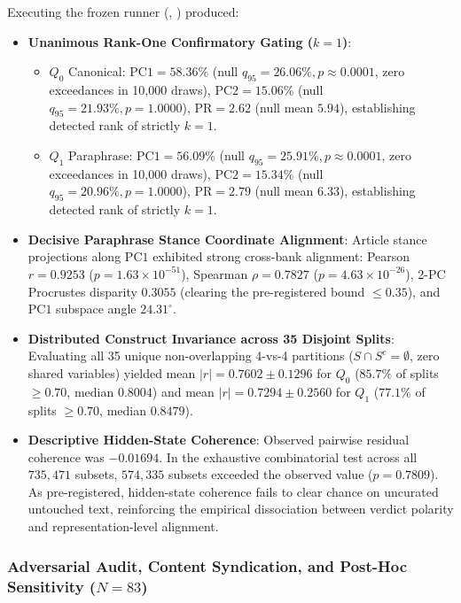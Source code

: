 Executing the frozen runner (, ) produced:
\begin{itemize}
    \item \textbf{Unanimous Rank-One Confirmatory Gating ($k=1$)}:
    \begin{itemize}
        \item $Q_0$ Canonical: $\mathrm{PC1} = 58.36\%$ (null $q_{95} = 26.06\%, p \approx 0.0001$, zero exceedances in 10,000 draws), $\mathrm{PC2} = 15.06\%$ (null $q_{95} = 21.93\%, p = 1.0000$), $\mathrm{PR} = 2.62$ (null mean $5.94$), establishing detected rank of strictly $k = 1$.
        \item $Q_1$ Paraphrase: $\mathrm{PC1} = 56.09\%$ (null $q_{95} = 25.91\%, p \approx 0.0001$, zero exceedances in 10,000 draws), $\mathrm{PC2} = 15.34\%$ (null $q_{95} = 20.96\%, p = 1.0000$), $\mathrm{PR} = 2.79$ (null mean $6.33$), establishing detected rank of strictly $k = 1$.
    \end{itemize}
    \item \textbf{Decisive Paraphrase Stance Coordinate Alignment}: Article stance projections along $\mathrm{PC1}$ exhibited strong cross-bank alignment: Pearson $r = 0.9253$ ($p = 1.63 \times 10^{-51}$), Spearman $\rho = 0.7827$ ($p = 4.63 \times 10^{-26}$), 2-PC Procrustes disparity $0.3055$ (clearing the pre-registered bound $\le 0.35$), and $\mathrm{PC1}$ subspace angle $24.31^\circ$.
    \item \textbf{Distributed Construct Invariance across 35 Disjoint Splits}: Evaluating all 35 unique non-overlapping 4-vs-4 partitions ($S \cap S^c = \emptyset$, zero shared variables) yielded mean $|r| = 0.7602 \pm 0.1296$ for $Q_0$ ($85.7\%$ of splits $\ge 0.70$, median $0.8004$) and mean $|r| = 0.7294 \pm 0.2560$ for $Q_1$ ($77.1\%$ of splits $\ge 0.70$, median $0.8479$).
    \item \textbf{Descriptive Hidden-State Coherence}: Observed pairwise residual coherence was $-0.01694$. In the exhaustive combinatorial test across all $735{,}471$ subsets, $574{,}335$ subsets exceeded the observed value ($p = 0.7809$). As pre-registered, hidden-state coherence fails to clear chance on uncurated untouched text, reinforcing the empirical dissociation between verdict polarity and representation-level alignment.
\end{itemize}
\subsubsection{Adversarial Audit, Content Syndication, and Post-Hoc Sensitivity ($N=83$)}

